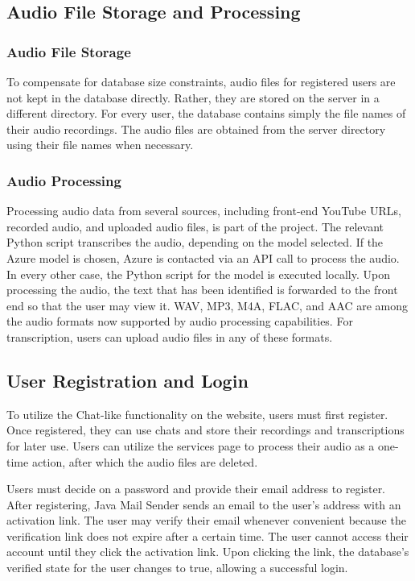 \documentclass[conference]{IEEEtran}
\begin{document}
\subsection{Audio File Storage and Processing}

\subsubsection{Audio File Storage}

To compensate for database size constraints, audio files for registered users are not kept in the database directly. Rather, they are stored on the server in a different directory. For every user, the database contains simply the file names of their audio recordings. The audio files are obtained from the server directory using their file names when necessary.

\subsubsection{Audio Processing}

Processing audio data from several sources, including front-end YouTube URLs, recorded audio, and uploaded audio files, is part of the project. The relevant Python script transcribes the audio, depending on the model selected. If the Azure model is chosen, Azure is contacted via an API call to process the audio. In every other case, the Python script for the model is executed locally. Upon processing the audio, the text that has been identified is forwarded to the front end so that the user may view it. WAV, MP3, M4A, FLAC, and AAC are among the audio formats now supported by audio processing capabilities. For transcription, users can upload audio files in any of these formats.


\subsection{User Registration and Login}

To utilize the Chat-like functionality on the website, users must first register. Once registered, they can use chats and store their recordings and transcriptions for later use. Users can utilize the services page to process their audio as a one-time action, after which the audio files are deleted. 

Users must decide on a password and provide their email address to register. After registering, Java Mail Sender sends an email to the user's address with an activation link. The user may verify their email whenever convenient because the verification link does not expire after a certain time. The user cannot access their account until they click the activation link. Upon clicking the link, the database's verified state for the user changes to true, allowing a successful login.
\end{document}

